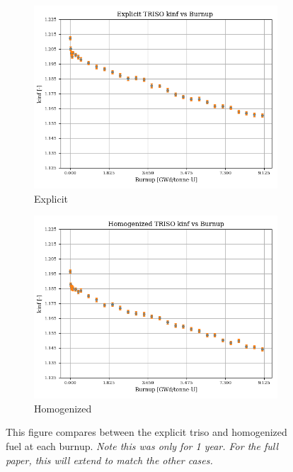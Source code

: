 \documentclass[letterpaper]{physor2024}
\begin{document}
\begin{figure}[!h]
    \centering
    \begin{subfigure}{0.49\linewidth}
        \centering
        \includegraphics[width=\linewidth]{figures/explicit_kinf_vs_burnup.png}
        \caption{Explicit}
    \end{subfigure}
    \begin{subfigure}{0.49\linewidth}
        \centering
        \includegraphics[width=\linewidth]{figures/homogenized_kinf_vs_burnup.png}
        \caption{Homogenized}
    \end{subfigure}
    \caption{This figure compares \kinf between the explicit \gls{triso} and homogenized  fuel at each burnup. \textit{Note this was only for 1 year. For the full paper, this will extend to match the other cases.}}
    \label{fig:kinf_vs_burnup_100_comp}
\end{figure}
\end{document}
